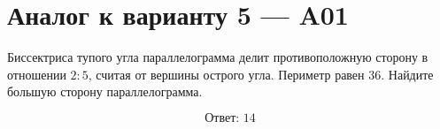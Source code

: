


\section*{Аналог к варианту 5 — A01}
Биссектриса тупого угла параллелограмма делит противоположную сторону в отношении \(2:5\), считая от вершины острого угла. Периметр равен \(36\). Найдите большую сторону параллелограмма.
\begin{center}\figParallelogramBisector\end{center}
\[\boxed{\text{Ответ: }14}\]

